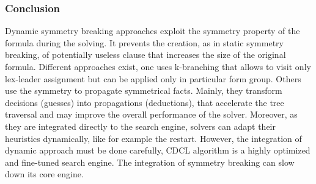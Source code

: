 
\subsubsection{Conclusion} 
Dynamic symmetry breaking approaches exploit the symmetry property of the formula during the solving.
It prevents the creation, as in static symmetry breaking, of potentially useless clause that increases the size of the original formula.
Different approaches exist, one uses k-branching that allows to visit only lex-leader assignment but can be applied only in particular form group.
Others use the symmetry to propagate symmetrical facts.
Mainly, they transform decisions (guesses) into propagations (deductions), that accelerate the tree traversal and may improve the overall performance of the solver. 
Moreover, as they are integrated directly to the search engine, solvers can adapt their heuristics dynamically, like for
example the restart.
However, the integration of dynamic approach must be done carefully, CDCL algorithm is a highly optimized and 
fine-tuned search engine. The integration of symmetry breaking can slow down its core engine.


